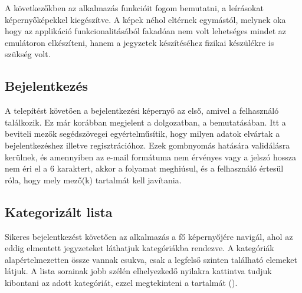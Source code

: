 A következőkben az alkalmazás funkcióit fogom bemutatni, a leírásokat képernyőképekkel kiegészítve. A képek néhol eltérnek egymástól, melynek oka hogy az applikáció funkcionalitásából fakadóan nem volt lehetséges mindet az emulátoron elkészíteni, hanem a jegyzetek készítéséhez fizikai készülékre is szükség volt.

\subsection{Bejelentkezés}
A telepítést követően a bejelentkezési képernyő az első, amivel a felhasználó találkozik. Ez már korábban megjelent a dolgozatban, a  bemutatásában. Itt a beviteli mezők segédszövegei egyértelműsítik, hogy milyen adatok elvártak a bejelentkezéshez illetve regisztrációhoz. Ezek gombnyomás hatására validálásra kerülnek, és amennyiben az e-mail formátuma nem érvényes vagy a jelszó hossza nem éri el a 6 karaktert, akkor a folyamat meghiúsul, és a felhasználó értesül róla, hogy mely mező(k) tartalmát kell javítania. 

\subsection{Kategorizált lista}
Sikeres bejelentkezést követően az alkalmazás a fő képernyőjére navigál, ahol az eddig elmentett jegyzeteket láthatjuk kategóriákba rendezve. A kategóriák alapértelmezetten össze vannak csukva, csak a legfelső szinten található elemeket látjuk. A lista sorainak jobb szélén elhelyezkedő nyilakra kattintva tudjuk kibontani az adott kategóriát, ezzel megtekinteni a tartalmát ().

